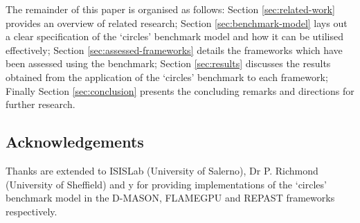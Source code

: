   The remainder of this paper is organised as follows: Section \ref{sec:related-work} provides an overview of related research; Section \ref{sec:benchmark-model} lays out a clear specification of the `circles' benchmark model and how it can be utilised effectively; Section \ref{sec:assessed-frameworks} details the frameworks which have been assessed using the benchmark; Section \ref{sec:results} discusses the results obtained from the application of the `circles' benchmark to each framework; Finally Section \ref{sec:conclusion} presents the concluding remarks and directions for further research.
  
  \subsection*{Acknowledgements}
    Thanks are extended to ISISLab (University of Salerno), Dr P. Richmond (University of Sheffield) and y for providing implementations of the `circles' benchmark model in the D-MASON, FLAMEGPU and REPAST frameworks respectively.
